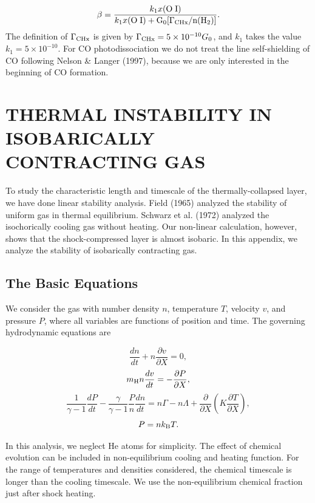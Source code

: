 \begin{equation}
\beta=\frac{k_1x(\rm{O} \; \small{I})}
{k_1x(\rm{O} \; \small{I})+G_0[\Gamma_{\rm CHx}/n({\rm H_2})]}. 
\end{equation}
The definition of $\Gamma_{\rm CHx}$ is given by 
$\Gamma_{\rm CHx}=5\times 10^{-10}G_0$, and $k_1$ takes the 
value $k_1=5\times 10^{-10}$.
For CO photodissociation we do not treat the line self-shielding of CO
following Nelson \& Langer (1997),
because we are only interested in the beginning of CO formation.

\section{THERMAL INSTABILITY IN ISOBARICALLY CONTRACTING GAS}\label{LINEAR}
To study the characteristic length and timescale of the
thermally-collapsed layer,
we have done linear stability analysis.
Field (1965) analyzed the stability of uniform gas in thermal equilibrium.
Schwarz et al. (1972) analyzed the isochorically cooling gas without heating. 
Our non-linear calculation, however, shows that 
the shock-compressed layer is almost isobaric.
In this appendix, we analyze the stability of isobarically contracting gas.

\subsection{The Basic Equations}

We consider the gas with number density $n$, temperature $T$,
velocity $v$, and pressure $P$, 
where all variables are functions of position and time.
The governing hydrodynamic equations are

\begin{equation}
\frac{dn}{dt}+n\frac{\partial v}{\partial X}=0,
\end{equation}
\begin{equation}
m_{\rm H}n\frac{dv}{dt}=-\frac{\partial P}{\partial X},
\end{equation}
\begin{equation}
\frac{1}{\gamma-1}\frac{dP}{dt}
-\frac{\gamma}{\gamma-1}\frac{P}{n}\frac{dn}{dt}
=n\Gamma-n\Lambda+
\frac{\partial}{\partial X} \left(K\frac{\partial T}{\partial X}\right),
\end{equation}
\begin{equation}
P=nk_{\rm B}T.
\end{equation}

In this analysis,
we neglect He atoms for simplicity.
The effect of chemical evolution can be included in non-equilibrium 
cooling and heating function.
For the range of temperatures and densities considered, 
the chemical timescale is longer than the cooling timescale.
We use the non-equilibrium chemical fraction just after shock heating. 

